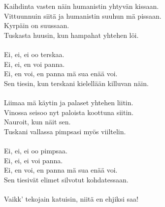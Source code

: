 
            Kaihdinta vasten näin humanistin yhtyvän kissaan. \\
            Vittuunnuin siitä ja humanistin suuhun mä pissaan. \\
            Kyrpäin on suussaan.  \\
            Tuskasta huusin, kun hampahat yhtehen löi. \\
\hspace{10mm} \\
            Ei, ei, ei oo terskaa. \\
            Ei, ei, en voi panna. \\
            Ei, en voi, en panna mä sua enää voi. \\
            Sen tiesin, kun terskani kielellään killuvan näin. \\
\hspace{10mm} \\
            Liimaa mä käytin ja palaset yhtehen liitin.  \\
            Vinossa seisoo nyt paloista koottuna siitin. \\
            Nauroit, kun näit sen. \\
            Tuskani vallassa pimpsasi myös viiltelin. \\
\hspace{10mm} \\
            Ei, ei, ei oo pimpsaa. \\
            Ei, ei, ei voi panna. \\
            Ei, en voi, en panna mä sua enää voi.  \\
            Sen tiesivät elimet silvotut kohdatessaan. \\
\hspace{10mm} \\
            Vaikk' tekojain katuisin, niitä en ehjiksi saa! \\
